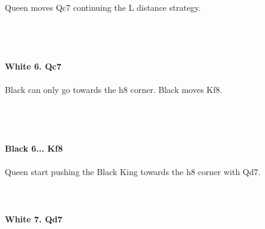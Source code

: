 \documentclass{article}
\begin{document}
Queen moves Qc7 continuing the L distance strategy.\\\\
\\

\\
\\
\textbf{White 6. Qc7}\\
\\
Black can only go towards the h8 corner. Black moves Kf8.\\\\
\\

\\
\\
\textbf{Black 6... Kf8}\\
\\
Queen start pushing the Black King towards the h8 corner with Qd7.\\
\\

\\
\\
\textbf{White 7. Qd7}\\
\\
\end{document}
